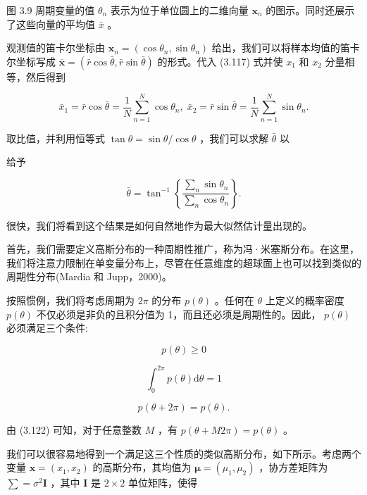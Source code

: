 \documentclass[10pt]{article}
\begin{document}
图 3.9 周期变量的值 \({\theta }_{n}\) 表示为位于单位圆上的二维向量 \({\mathbf{x}}_{n}\) 的图示。同时还展示了这些向量的平均值 \(\bar{x}\) 。

观测值的笛卡尔坐标由 \({\mathbf{x}}_{n} = \left( {\cos {\theta }_{n},\sin {\theta }_{n}}\right)\) 给出，我们可以将样本均值的笛卡尔坐标写成 \(\overline{\mathbf{x}} = \left( {\bar{r}\cos \bar{\theta },\bar{r}\sin \bar{\theta }}\right)\) 的形式。代入 (3.117) 式并使 \({x}_{1}\) 和 \({x}_{2}\) 分量相等，然后得到

\[
{\bar{x}}_{1} = \bar{r}\cos \bar{\theta } = \frac{1}{N}\mathop{\sum }\limits_{{n = 1}}^{N}\cos {\theta }_{n},\;{\bar{x}}_{2} = \bar{r}\sin \bar{\theta } = \frac{1}{N}\mathop{\sum }\limits_{{n = 1}}^{N}\sin {\theta }_{n}. \tag{3.118}
\]

取比值，并利用恒等式 \(\tan \theta  = \sin \theta /\cos \theta\) ，我们可以求解 \(\bar{\theta }\) 以

给予

\[
\bar{\theta } = {\tan }^{-1}\left\{  \frac{\mathop{\sum }\limits_{n}\sin {\theta }_{n}}{\mathop{\sum }\limits_{n}\cos {\theta }_{n}}\right\}  . \tag{3.119}
\]

很快，我们将看到这个结果是如何自然地作为最大似然估计量出现的。

首先，我们需要定义高斯分布的一种周期性推广，称为冯·米塞斯分布。在这里，我们将注意力限制在单变量分布上，尽管在任意维度的超球面上也可以找到类似的周期性分布(Mardia 和 Jupp，2000)。

按照惯例，我们将考虑周期为 \({2\pi }\) 的分布 \(p\left( \theta \right)\) 。任何在 \(\theta\) 上定义的概率密度 \(p\left( \theta \right)\) 不仅必须是非负的且积分值为 1，而且还必须是周期性的。因此， \(p\left( \theta \right)\) 必须满足三个条件:

\[
p\left( \theta \right)  \geq  0 \tag{3.120}
\]

\[
{\int }_{0}^{2\pi }p\left( \theta \right) \mathrm{d}\theta  = 1 \tag{3.121}
\]

\[
p\left( {\theta  + {2\pi }}\right)  = p\left( \theta \right) . \tag{3.122}
\]

由 (3.122) 可知，对于任意整数 \(M\) ，有 \(p\left( {\theta  + {M2\pi }}\right)  = p\left( \theta \right)\) 。

我们可以很容易地得到一个满足这三个性质的类似高斯分布，如下所示。考虑两个变量 \(\mathbf{x} = \left( {{x}_{1},{x}_{2}}\right)\) 的高斯分布，其均值为 \(\mathbf{\mu } = \left( {{\mu }_{1},{\mu }_{2}}\right)\) ，协方差矩阵为 \(\mathbf{\sum } = {\sigma }^{2}\mathbf{I}\) ，其中 \(\mathbf{I}\) 是 \(2 \times  2\) 单位矩阵，使得
\end{document}
